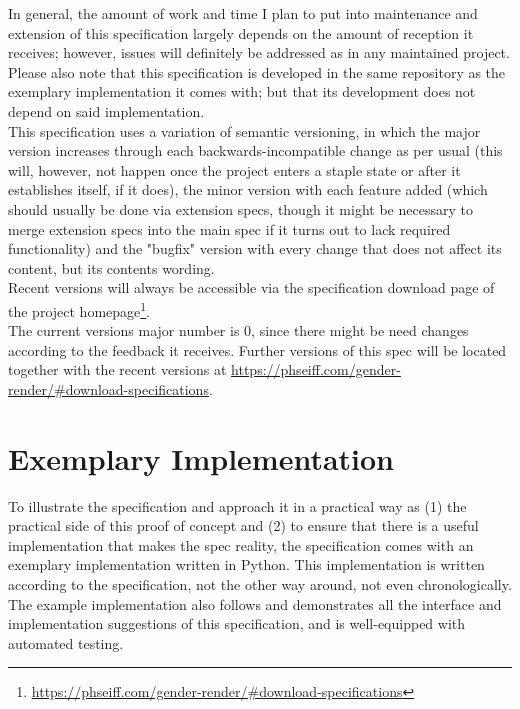 \documentclass{article}
\begin{document}
    In general, the amount of work and time I plan to put into maintenance and extension of this specification largely depends on the amount of reception it receives;
    however, issues will definitely be addressed as in any maintained project.
    Please also note that this specification is developed in the same repository as the exemplary implementation it comes with;
    but that its development does not depend on said implementation.\\

    This specification uses a variation of semantic versioning, in which the major version increases through each backwards-incompatible change as per usual (this will, however, not happen once the project enters a staple state or after it establishes itself, if it does), the minor version with each feature added (which should usually be done via extension specs, though it might be necessary to merge extension specs into the main spec if it turns out to lack required functionality) and the "bugfix" version with every change that does not affect its content, but its contents wording.\\

    Recent versions will always be accessible via the specification download page of the project homepage\footnote{\url{https://phseiff.com/gender-render/\#download-specifications}}.\\

    The current versions major number is 0, since there might be need changes according to the feedback it receives.
    Further versions of this spec will be located together with the recent versions at \url{https://phseiff.com/gender-render/\#download-specifications}.\\

\section{Exemplary Implementation}

    To illustrate the specification and approach it in a practical way as (1) the practical side of this proof of concept and (2) to ensure that there is a useful implementation that makes the spec reality, the specification comes with an exemplary implementation written in Python.
    This implementation is written according to the specification, not the other way around, not even chronologically.
    The example implementation also follows and demonstrates all the interface and implementation suggestions of this specification, and is well-equipped with automated testing.\\
\end{document}
